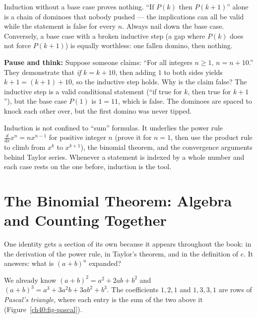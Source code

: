 \begin{trapbox}
Induction without a base case proves nothing. ``If $P(k)$ then $P(k+1)$'' alone is
a chain of dominoes that nobody pushed --- the implications can all be valid while
the statement is false for every $n$. Always nail down the base case. Conversely, a
base case with a broken inductive step (a gap where $P(k)$ does not force
$P(k+1)$) is equally worthless: one fallen domino, then nothing.
\end{trapbox}

\begin{recoverybox}
\textbf{Pause and think:} Suppose someone claims: ``For all integers $n \ge 1$,
$n = n + 10$.'' They demonstrate that \emph{if} $k = k + 10$, then adding $1$ to
both sides yields $k + 1 = (k + 1) + 10$, so the inductive step holds. Why is the
claim false?
The inductive step is a valid conditional statement (``if true for $k$, then true
for $k+1$''), but the base case $P(1)$ is $1 = 11$, which is false. The
dominoes are spaced to knock each other over, but the first domino was never tipped.
\end{recoverybox}

\begin{connectionbox}
Induction is not confined to ``sum'' formulas. It underlies the power rule
$\frac{d}{dx}x^n = nx^{n-1}$ for positive integer $n$ (prove it for $n=1$, then
use the product rule to climb from $x^k$ to $x^{k+1}$), the binomial theorem, and
the convergence arguments behind Taylor series. Whenever a statement is indexed by
a whole number and each case rests on the one before, induction is the tool.
\end{connectionbox}

\section{The Binomial Theorem: Algebra and Counting Together}
\label{ch40:binomial}

One identity gets a section of its own because it appears throughout the
book: in the derivation of the power rule, in Taylor's theorem, and in
the definition of $e$. It answers: what is $(a+b)^n$ expanded?

We already know $(a+b)^2 = a^2 + 2ab + b^2$ and $(a+b)^3 = a^3 + 3a^2b + 3ab^2 +
b^3$. The coefficients $1,2,1$ and $1,3,3,1$ are rows of \emph{Pascal's
triangle}, where each entry is the sum of the two above it
(Figure~\ref{ch40:fig-pascal}).

